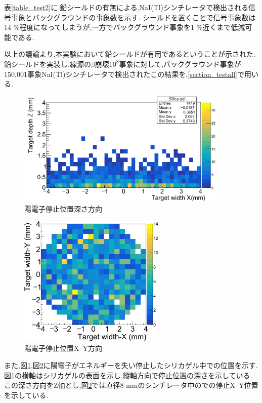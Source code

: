 表\ref{table_test2}に,鉛シールドの有無による,NaI(Tl)シンチレータで検出される信号事象とバックグラウンドの事象数を示す.
シールドを置くことで信号事象数は14 \%程度になってしまうが,一方でバックグラウンド事象を1 \%近くまで低減可能である.

以上の議論より,本実験において鉛シールドが有用であるということが示された.
鉛シールドを実装し,線源の$\beta$崩壊$10^8$事象に対して,バックグラウンド事象が150,001事象NaI(Tl)シンチレータで検出されたこの結果を,\ref{section_testall}で用いる.

\begin{figure}[!tbp]
	\centering
		\includegraphics[width=10cm]{fig/test2bXY.pdf}
	\caption[陽電子停止位置深さ方向]{陽電子停止位置深さ方向}
	\label{test2bXY}
\end{figure}

\begin{figure}[!tbp]
	\centering
		\includegraphics[width=7cm]{fig/test2bYZ.pdf}
	\caption[陽電子停止位置X--Y方向]{陽電子停止位置X--Y方向}
	\label{test2bYZ}
\end{figure}



また,図\ref{test2bXY},図\ref{test2bYZ}に陽電子がエネルギーを失い停止したシリカゲル中での位置を示す.
図\ref{test2bXY}の横軸はシリカゲルの表面を示し,縦軸方向で停止位置の深さを示している.
この深さ方向をZ軸とし,図\ref{test2bYZ}では直径8 mmのシンチレータ中のでの停止X--Y位置を示している.

